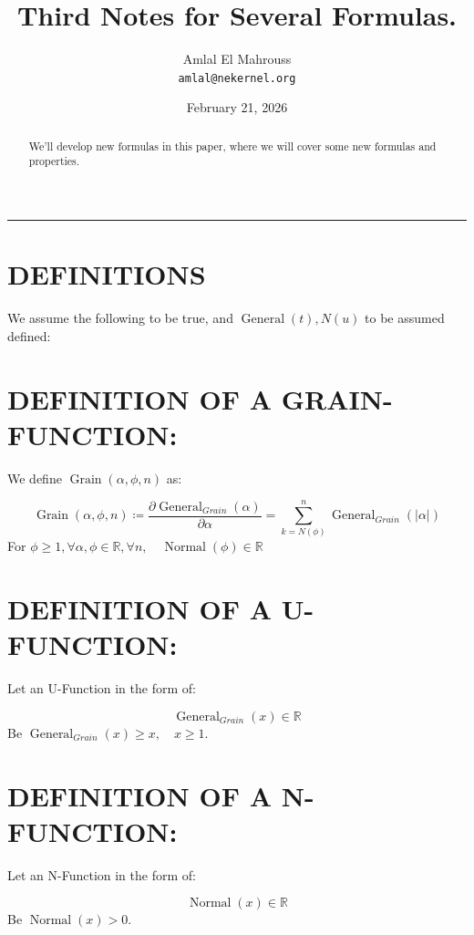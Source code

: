 \documentclass[11pt, a4paper]{article}
\title{Third Notes for Several Formulas.}
\author{Amlal El Mahrouss\\\texttt{amlal@nekernel.org}}
\date{February 21, 2026}
\begin{document}
\maketitle

\begin{center}
	\rule[0.01cm]{17cm}{0.01cm}
\end{center}

\begin{abstract}
\begin{center}
    We'll develop new formulas in this paper, where we will cover some new formulas and properties.
\end{center}
\end{abstract}

\section{DEFINITIONS}

We assume the following to be true, and $\operatorname{General}(t), N(u)$ to be assumed defined:

\section{DEFINITION OF A GRAIN-FUNCTION:}

We define $\operatorname{Grain}(\alpha, \phi, n)$ as:

\begin{equation}
    \operatorname{Grain}(\alpha, \phi, n) \coloneqq \frac{\partial \operatorname{General}_{Grain}(\alpha)}{\partial \alpha} = \sum_{k=N(\phi)}^{n} \operatorname{General}_{Grain}(|\alpha|)
\end{equation}
For $\phi \geq 1, \forall \alpha, \phi \in \mathbb{R}, \forall n, \quad \operatorname{Normal}(\phi) \in \mathbb{R}$

\section{DEFINITION OF A U-FUNCTION:}

Let an U-Function in the form of:

\begin{equation}
    \operatorname{General}_{Grain}(x) \in \mathbb{R}
\end{equation}
Be $\operatorname{General}_{Grain}(x) \geq x, \quad x \geq 1$.

\section{DEFINITION OF A N-FUNCTION:}

Let an N-Function in the form of:

\begin{equation}
    \operatorname{Normal}(x) \in \mathbb{R}
\end{equation}
Be $\operatorname{Normal}(x) > 0$.
\end{document}

